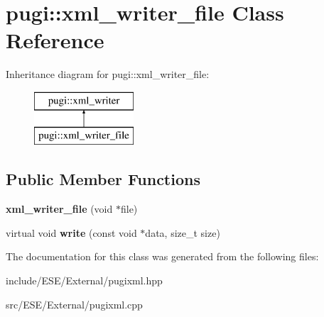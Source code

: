 \hypertarget{classpugi_1_1xml__writer__file}{\section{pugi\-:\-:xml\-\_\-writer\-\_\-file Class Reference}
\label{classpugi_1_1xml__writer__file}
}
Inheritance diagram for pugi\-:\-:xml\-\_\-writer\-\_\-file\-:\begin{figure}[H]
\begin{center}
\leavevmode
\includegraphics[height=2.000000cm]{classpugi_1_1xml__writer__file}
\end{center}
\end{figure}
\subsection*{Public Member Functions}
\begin{DoxyCompactItemize}
\item 
\hypertarget{classpugi_1_1xml__writer__file_a458afaf5231f88e182fa16b13fc2b0a6}{{\bfseries xml\-\_\-writer\-\_\-file} (void $\ast$file)}\label{classpugi_1_1xml__writer__file_a458afaf5231f88e182fa16b13fc2b0a6}

\item 
\hypertarget{classpugi_1_1xml__writer__file_a228a6e448d8fdbc155032e6eab5d86ed}{virtual void {\bfseries write} (const void $\ast$data, size\-\_\-t size)}\label{classpugi_1_1xml__writer__file_a228a6e448d8fdbc155032e6eab5d86ed}

\end{DoxyCompactItemize}


The documentation for this class was generated from the following files\-:\begin{DoxyCompactItemize}
\item 
include/\-E\-S\-E/\-External/pugixml.\-hpp\item 
src/\-E\-S\-E/\-External/pugixml.\-cpp\end{DoxyCompactItemize}
